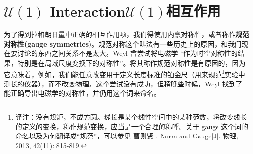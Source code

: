 \section[$\mathcal{U}(1)$相互作用]{$\mathcal{U}(1)$ Interaction\quad $\mathcal{U}(1)$相互作用}\label{sec7.1}
为了得到拉格朗日量中正确的相互作用项，我们得使用内禀对称性，或者称作{\bfseries 规范对称性(gauge symmetries)}。规范对称这个叫法有一些历史上的原因，和我们现在要讨论的东西之间关系不是太大。Weyl 曾尝试将电磁学%
%
“作为时空对称性的结果，特别是在局域尺度变换下的对称性”。将其称作规范对称性是有原因的，因为它意味着，例如，我们能任意改变用于定义长度标准的铂金尺（用来规范\footnote{译注：没有规矩，不成方圆。线长是某个线性空间中的某种范数，将改变线长的定义的变换，称作规范变换，应当是一个合理的称呼。关于 gauge 这个词的命名以及为何翻译成“规范”，可以参见 曹则贤 . Norm and Gauge[J]. 物理, 2013, 42(11): 815-819. }实验中测长的仪器），而不改变物理。这个尝试没有成功，但稍晚些时候，Weyl 找到了能正确导出电磁学的对称性，并仍用这个词来命名。

